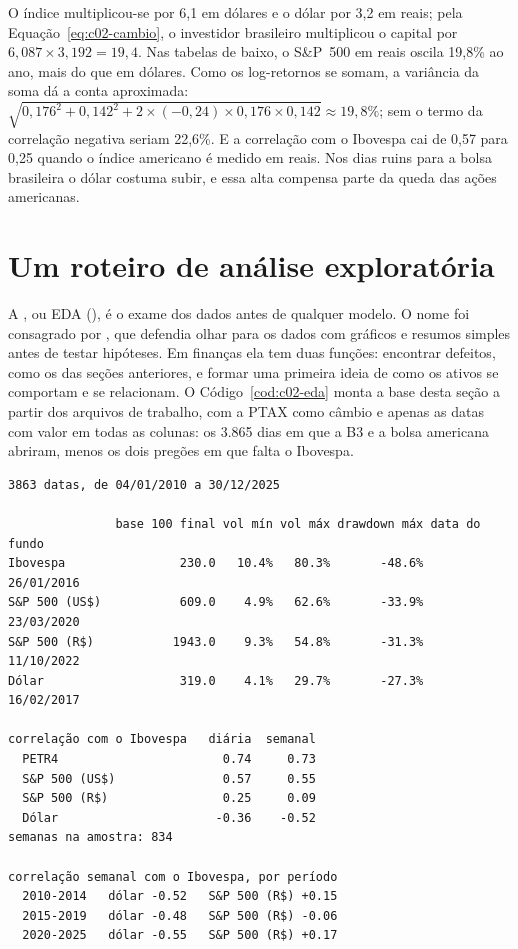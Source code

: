 O índice multiplicou-se por 6,1 em dólares e o dólar por 3,2 em reais; pela Equação~\eqref{eq:c02-cambio}, o investidor brasileiro multiplicou o capital por $6,087 \times 3,192 = 19,4$. Nas tabelas de baixo, o S\&P~500 em reais oscila 19,8\% ao ano, mais do que em dólares. Como os log-retornos se somam, a variância da soma dá a conta aproximada: $\sqrt{0,176^2 + 0,142^2 + 2 \times (-0,24) \times 0,176 \times 0,142} \approx 19,8\%$; sem o termo da correlação negativa seriam 22,6\%. E a correlação com o Ibovespa cai de 0,57 para 0,25 quando o índice americano é medido em reais. Nos dias ruins para a bolsa brasileira o dólar costuma subir, e essa alta compensa parte da queda das ações americanas.

\section{Um roteiro de análise exploratória}
\label{sec:c02-eda}

A , ou EDA (), é o exame dos dados antes de qualquer modelo. O nome foi consagrado por \citet{tukey1977}, que defendia olhar para os dados com gráficos e resumos simples antes de testar hipóteses. Em finanças ela tem duas funções: encontrar defeitos, como os das seções anteriores, e formar uma primeira ideia de como os ativos se comportam e se relacionam. O Código~\ref{cod:c02-eda} monta a base desta seção a partir dos arquivos de trabalho, com a PTAX como câmbio e apenas as datas com valor em todas as colunas: os 3.865 dias em que a B3 e a bolsa americana abriram, menos os dois pregões em que falta o Ibovespa.


\begin{lstlisting}[style=saida]
3863 datas, de 04/01/2010 a 30/12/2025

               base 100 final vol mín vol máx drawdown máx data do fundo
Ibovespa                230.0   10.4%   80.3%       -48.6%    26/01/2016
S&P 500 (US$)           609.0    4.9%   62.6%       -33.9%    23/03/2020
S&P 500 (R$)           1943.0    9.3%   54.8%       -31.3%    11/10/2022
Dólar                   319.0    4.1%   29.7%       -27.3%    16/02/2017

correlação com o Ibovespa   diária  semanal
  PETR4                       0.74     0.73
  S&P 500 (US$)               0.57     0.55
  S&P 500 (R$)                0.25     0.09
  Dólar                      -0.36    -0.52
semanas na amostra: 834

correlação semanal com o Ibovespa, por período
  2010-2014   dólar -0.52   S&P 500 (R$) +0.15
  2015-2019   dólar -0.48   S&P 500 (R$) -0.06
  2020-2025   dólar -0.55   S&P 500 (R$) +0.17
\end{lstlisting}


